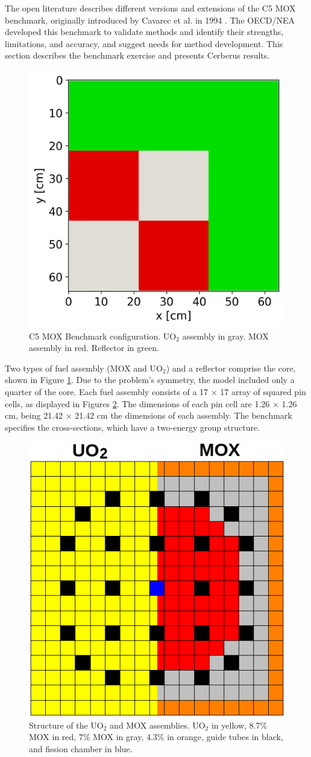\documentclass{anstrans}
\begin{document}
The open literature describes different versions and extensions of the C5 MOX benchmark, originally introduced by Cavarec et al. in 1994 \cite{cavarec_benchmark_1994}.
The \gls{OECD}/\gls{NEA} developed this benchmark to validate methods and identify their strengths, limitations, and accuracy, and suggest needs for method development.
This section describes the benchmark exercise and presents Cerberus results.

\begin{figure}[htbp!] %
    \centering
    \includegraphics[width=0.55\linewidth]{figures/geo-xy2.png}
    \hfill
    \caption{C5 MOX Benchmark configuration. UO$_2$ assembly in gray. MOX assembly in red. Reflector in green.}
    \label{fig:bench1}
\end{figure}

Two types of fuel assembly (MOX and UO$_2$) and a reflector comprise the core, shown in Figure \ref{fig:bench1}.
Due to the problem's symmetry, the model included only a quarter of the core.
Each fuel assembly consists of a 17 $\times$ 17 array of squared pin cells, as displayed in Figures \ref{fig:bench2}.
The dimensions of each pin cell are 1.26 $\times$ 1.26 cm, being 21.42 $\times$ 21.42 cm the dimensions of each assembly.
The benchmark \cite{cavarec_benchmark_1994} specifies the cross-sections, which have a two-energy group structure.


\begin{figure}[htbp!] %
    \centering
    \includegraphics[width=0.45\linewidth]{figures/bench-config2.png}
    \hfill
    \caption{Structure of the UO$_2$ and MOX assemblies. UO$_2$ in yellow, 8.7\% MOX in red, 7\% MOX in gray, 4.3\% in orange, guide tubes in black, and fission chamber in blue.}
    \label{fig:bench2}
\end{figure}
\end{document}
